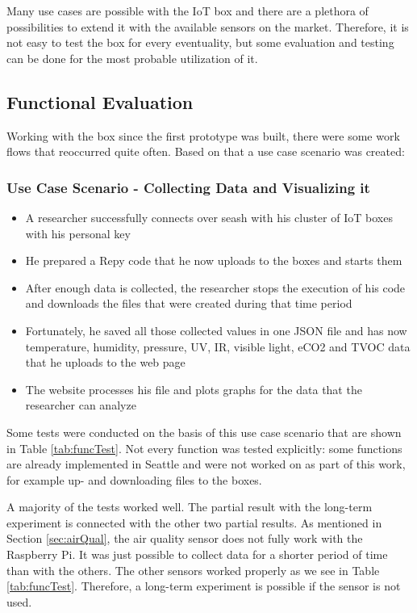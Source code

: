 \documentclass{article}      %
\begin{document}
Many use cases are possible with the \gls{IoT} box and there are a plethora of possibilities to extend it with the available sensors on the market. Therefore, it is not easy to test the box for every eventuality, but some evaluation and testing can be done for the most probable utilization of it.

\subsection{Functional Evaluation}

Working with the box since the first prototype was built, there were some work flows that reoccurred quite often. Based on that a use case scenario was created:

\subsubsection*{\textbf{Use Case Scenario - Collecting Data and Visualizing it}}

\begin{itemize}
  \setlength\itemsep{0em}
  \item A researcher successfully connects over \gls{seash} with his cluster of \gls{IoT} boxes with his personal key
  \item He prepared a \gls{Repy} code that he now uploads to the boxes and starts them
  \item After enough data is collected, the researcher stops the execution of his code and downloads the files that were created during that time period
  \item Fortunately, he saved all those collected values in one JSON file and has now temperature, humidity, pressure, \gls{UV}, \gls{IR}, visible light, \gls{eCO2} and \gls{TVOC} data that he uploads to the web page
  \item The website processes his file and plots graphs for the data that the researcher can analyze
\end{itemize}

Some tests were conducted on the basis of this use case scenario that are shown in Table \ref{tab:funcTest}. Not every function was tested explicitly: some functions are already implemented in Seattle and were not worked on as part of this work, for example up- and downloading files to the boxes.

A majority of the tests worked well. The partial result with the long-term experiment is connected with the other two partial results. As mentioned in Section \ref{sec:airQual}, the air quality sensor does not fully work with the Raspberry Pi. It was just possible to collect data for a shorter period of time than with the others. The other sensors worked properly as we see in Table \ref{tab:funcTest}. Therefore, a long-term experiment is possible if the sensor is not used.
\end{document}
